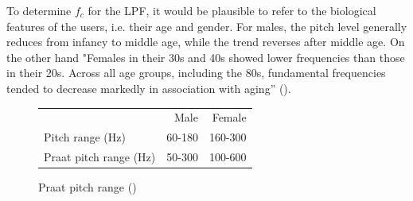 To determine $f_c$ for the LPF, it would be plausible to refer to the biological features of the users, i.e. their age and gender.
For males, the pitch level generally reduces from infancy to middle age, while the trend reverses after middle age. 
On the other hand "Females in their 30s and 40s showed lower frequencies than those in their 20s. Across all age groups, including the 80s, fundamental frequencies tended to decrease markedly in association with aging” (\cite{womenprange}).


\begin{figure}
    \CenterFloatBoxes
    \begin{floatrow}
        \killfloatstyle
        \ttabbox
            {\begin{tabular}{lrr}		& Male   & Female  \\
			    Pitch range (Hz)            & 60-180 & 160-300 \\
			    Praat pitch range (Hz) 		& 50-300 & 100-600
		    \end{tabular}
            }{
            \label{table:praat}
            \caption{Praat pitch range (\cite{lifespan})}
            }
    \end{floatrow}
\end{figure}

